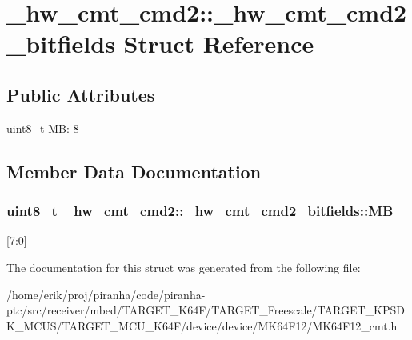 \hypertarget{struct__hw__cmt__cmd2_1_1__hw__cmt__cmd2__bitfields}{}\section{\+\_\+hw\+\_\+cmt\+\_\+cmd2\+:\+:\+\_\+hw\+\_\+cmt\+\_\+cmd2\+\_\+bitfields Struct Reference}
\label{struct__hw__cmt__cmd2_1_1__hw__cmt__cmd2__bitfields}
\subsection*{Public Attributes}
\begin{DoxyCompactItemize}
\item 
uint8\+\_\+t \hyperlink{struct__hw__cmt__cmd2_1_1__hw__cmt__cmd2__bitfields_a198529b8fa757acf92772a0ee54cf449}{MB}\+: 8
\end{DoxyCompactItemize}


\subsection{Member Data Documentation}
\subsubsection[{\texorpdfstring{MB}{MB}}]{\setlength{\rightskip}{0pt plus 5cm}uint8\+\_\+t \+\_\+hw\+\_\+cmt\+\_\+cmd2\+::\+\_\+hw\+\_\+cmt\+\_\+cmd2\+\_\+bitfields\+::\+MB}\hypertarget{struct__hw__cmt__cmd2_1_1__hw__cmt__cmd2__bitfields_a198529b8fa757acf92772a0ee54cf449}{}\label{struct__hw__cmt__cmd2_1_1__hw__cmt__cmd2__bitfields_a198529b8fa757acf92772a0ee54cf449}
\mbox{[}7\+:0\mbox{]} 

The documentation for this struct was generated from the following file\+:\begin{DoxyCompactItemize}
\item 
/home/erik/proj/piranha/code/piranha-\/ptc/src/receiver/mbed/\+T\+A\+R\+G\+E\+T\+\_\+\+K64\+F/\+T\+A\+R\+G\+E\+T\+\_\+\+Freescale/\+T\+A\+R\+G\+E\+T\+\_\+\+K\+P\+S\+D\+K\+\_\+\+M\+C\+U\+S/\+T\+A\+R\+G\+E\+T\+\_\+\+M\+C\+U\+\_\+\+K64\+F/device/device/\+M\+K64\+F12/M\+K64\+F12\+\_\+cmt.\+h\end{DoxyCompactItemize}
